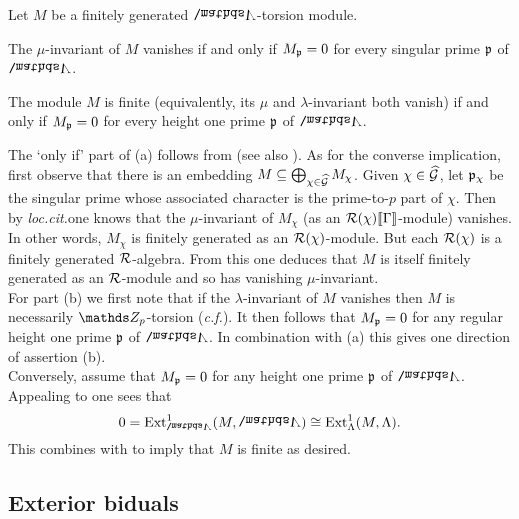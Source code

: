 \documentclass[a4paper, 
headsepline=off, DIV=12, titlepage=false]{scrartcl}
\begin{document}
\begin{lem} \label{IwasawaInvariants}
Let $M$ be a finitely generated $\bLambda$-torsion module.
\begin{liste}
\item The $\mu$-invariant of $M$ vanishes if and only if $M_{\mathfrak{p}} = 0$ for every singular prime $\mathfrak{p}$ of $\bLambda$.
\item The module $M$ is finite (equivalently, its $\mu$ and $\lambda$-invariant both vanish) if and only if $M_{\mathfrak{p}} = 0$ for every height one prime $\mathfrak{p}$ of $\bLambda$. 
\end{liste}
\end{lem}

\begin{proofbox}
The `only if' part of (a) follows from \cite[Lem. 5.6]{Flach} (see also \cite[Lem. 6.3]{BurnsGreither}). As for the converse implication, first observe that there is an embedding $M \subseteq \bigoplus_{\chi \in \widehat{\mathcal{G}}} M_\chi$. Given $\chi \in \widehat{\mathcal{G}}$, let $\mathfrak{p}_\chi$ be the singular prime whose associated character is the prime-to-$p$ part of $\chi$. Then by \textit{loc.\@ cit.}\@ one knows that the $\mu$-invariant of $M_\chi$ (as an $\mathcal{R}(\chi)\llbracket\Gamma\rrbracket$-module) vanishes. In other words, $M_\chi$ is finitely generated as an $\mathcal{R}(\chi)$-module. But each $\mathcal{R}(\chi)$ is a finitely generated $\mathcal{R}$-algebra. From this one deduces that $M$ is itself finitely generated as an $\mathcal{R}$-module and so has vanishing $\mu$-invariant.\\

For part (b) we first note that if the $\lambda$-invariant of $M$ vanishes then $M$ is necessarily $\ZZ_p$-torsion (\textit{c.f.}\@ \cite[Rem.\@ 3 following Def. 5.3.9]{NSW}). It then follows that $M_{\mathfrak{p}} = 0$ for any regular height one prime $\mathfrak{p}$ of $\bLambda$. In combination with (a) this gives one direction of assertion (b). \\
Conversely, assume that $M_{\mathfrak{p}} = 0$ for any height one prime $\mathfrak{p}$ of $\bLambda$. Appealing to \cite[Lemma B.11]{Sakamoto20} one sees that
\[
0 = \Ext^1_\bLambda (M, \bLambda ) \cong \Ext^1_\Lambda (M, \Lambda ). 
\]
This combines with \cite[Prop. 5.5.8(iv)]{NSW} to imply that $M$ is finite as desired.
\end{proofbox}

\subsection{Exterior biduals}
\label{AppendixBiduals}
\end{document}
